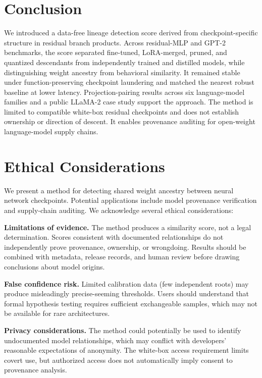 \section{Conclusion}

We introduced a data-free lineage detection score derived from checkpoint-specific structure in residual branch products. Across residual-MLP and GPT-2 benchmarks, the score separated fine-tuned, LoRA-merged, pruned, and quantized descendants from independently trained and distilled models, while distinguishing weight ancestry from behavioral similarity. It remained stable under function-preserving checkpoint laundering and matched the nearest robust baseline at lower latency. Projection-pairing results across six language-model families and a public LLaMA-2 case study support the approach. The method is limited to compatible white-box residual checkpoints and does not establish ownership or direction of descent. It enables provenance auditing for open-weight language-model supply chains.

\section*{Ethical Considerations}

We present a method for detecting shared weight ancestry between neural network checkpoints. Potential applications include model provenance verification and supply-chain auditing. We acknowledge several ethical considerations:

\textbf{Limitations of evidence.} The method produces a similarity score, not a legal determination. Scores consistent with documented relationships do not independently prove provenance, ownership, or wrongdoing. Results should be combined with metadata, release records, and human review before drawing conclusions about model origins.

\textbf{False confidence risk.} Limited calibration data (few independent roots) may produce misleadingly precise-seeming thresholds. Users should understand that formal hypothesis testing requires sufficient exchangeable samples, which may not be available for rare architectures.

\textbf{Privacy considerations.} The method could potentially be used to identify undocumented model relationships, which may conflict with developers' reasonable expectations of anonymity. The white-box access requirement limits covert use, but authorized access does not automatically imply consent to provenance analysis.

